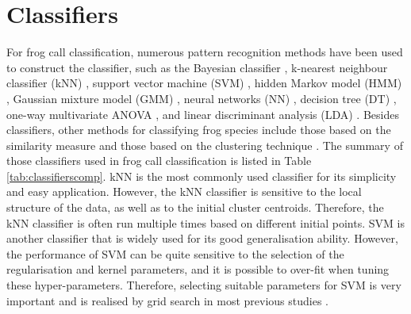 \section{Classifiers}
\label{classifiers}
For frog call classification, numerous pattern recognition methods have been used to construct the classifier, such as the Bayesian classifier \citep{Brandes2006}, k-nearest neighbour classifier (kNN) \citep{ huang2008realization,huang2009frog, han2011acoustic, dayou2011classification, jaafar2013, Gingras2013, jaafar2013mfcc,jaafarcomparative, yuan2012frog, vaca2010using, feature2012Colona}, support vector machine (SVM) \citep{huang2008realization,acevedo2009automated, huang2009frog, tanintelligent2014, Gingras2013,jaafarcomparative}, hidden Markov model (HMM) \citep{brandes2008feature}, Gaussian mixture model (GMM) \citep{huang2008realization, Gingras2013}, neural networks (NN) \citep{Huang20141, yen2002automatic}, decision tree (DT) \citep{grigg1996monitoring, acevedo2009automated}, one-way multivariate ANOVA \citep{camacho2013automatic}, and linear discriminant analysis (LDA) \citep{acevedo2009automated,lee2006automatic}.  Besides classifiers, other methods for classifying frog species include those based on the similarity measure \citep{croker2012using, dang2008lightweight, chen2012automatic} and those based on the clustering technique \citep{colombia2009frogs, wei2012distributed, bedoya2014automatic}. The summary of those classifiers used in frog call classification is listed in Table \ref{tab:classifierscomp}.
kNN is the most commonly used classifier for its simplicity and easy application. However, the kNN classifier is sensitive to the local structure of the data, as well as to the initial cluster centroids. Therefore, the kNN classifier is often run multiple times based on different initial points. 
SVM is another classifier that is widely used for its good generalisation ability. However, the performance of SVM can be quite sensitive to the selection of the regularisation and kernel parameters, and it is possible to over-fit when tuning these hyper-parameters. Therefore, selecting suitable parameters for SVM is very important and is realised by grid search in most previous studies \citep{hsu2003practical}.

